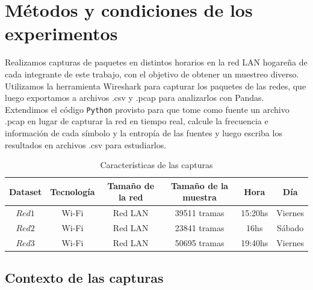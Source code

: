 \section{Métodos y condiciones de los experimentos}

Realizamos capturas de paquetes en distintos horarios en la red LAN hogareña de cada integrante de este trabajo, con el objetivo de obtener un muestreo diverso. Utilizamos la herramienta Wireshark para capturar los paquetes de las redes, que luego exportamos a archivos .csv y .pcap para analizarlos con Pandas. Extendimos el código \texttt{Python} provisto para que tome como fuente un archivo .pcap en lugar de capturar la red en tiempo real, calcule la frecuencia e información de cada símbolo y la entropía de las fuentes y luego escriba los resultados en archivos .csv para estudiarlos.

\begin{table}[H]
    \begin{center}
        \begin{tabular}{||c c c c c c||} 
             \hline
             Dataset & Tecnología & Tamaño de la red & Tamaño de la muestra & Hora & Día \\ [0.5ex] 
             \hline\hline
             $Red 1$ & Wi-Fi & Red LAN & 39511 tramas & 15:20hs & Viernes \\ 
             \hline
             $Red 2$ & Wi-Fi & Red LAN & 23841 tramas & 16hs & Sábado \\
             \hline
             $Red 3$ & Wi-Fi & Red LAN & 50695 tramas & 19:40hs & Viernes \\ [1ex] 
             \hline
        \end{tabular}
    \end{center}
    \caption{Características de las capturas}
    \label{tab: condiciones de datasets}
\end{table}


\subsection{Contexto de las capturas} 

